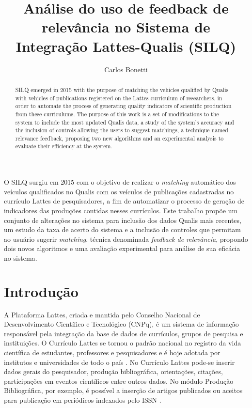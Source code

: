 \documentclass[12pt]{article}
\title{Análise do uso de feedback de relevância no Sistema de Integração Lattes-Qualis (SILQ)}
\author{Carlos Bonetti\inst{1}
}
\begin{document}
\maketitle

\begin{abstract}
   SILQ emerged in 2015 with the purpose of matching the vehicles qualified by Qualis with vehicles of publications registered on the Lattes curriculum of researchers, in order to automate the process of generating quality indicators of scientific production from these curriculums. The purpose of this work is a set of modifications to the system to include the most updated Qualis data, a study of the system's accuracy and the inclusion of controls allowing the users to suggest matchings, a technique named relevance feedback, proposing two new algorithms and an experimental analysis to evaluate their efficiency at the system.
\end{abstract}

\begin{resumo}
  O SILQ surgiu em 2015 com o objetivo de realizar o \textit{matching} automático dos veículos qualificados no Qualis com os veículos de publicações cadastradas no currículo Lattes de pesquisadores, a fim de automatizar o processo de geração de indicadores das produções contidas nesses currículos. Este trabalho propõe um conjunto de alterações no sistema para inclusão dos dados Qualis mais recentes, um estudo da taxa de acerto do sistema e a inclusão de controles que permitam ao usuário sugerir \textit{matching}, técnica denominada \textit{feedback de relevância}, propondo dois novos algoritmos e uma avaliação experimental para análise de sua eficácia no sistema.
\end{resumo}

\section{Introdução}

A Plataforma Lattes, criada e mantida pelo Conselho Nacional de Desenvolvimento Científico e Tecnológico (CNPq), é um sistema de informação responsável pela integração da base de dados de currículos, grupos de pesquisa e instituições. O Currículo Lattes se tornou o padrão nacional no registro da vida científica de estudantes, professores e pesquisadores e é hoje adotada por institutos e universidades de todo o país \cite{CNPQ-Sobre}. No Currículo Lattes pode-se inserir dados gerais do pesquisador, produção bibliográfica, orientações, citações, participações em eventos científicos entre outros dados. No módulo Produção Bibliográfica, por exemplo, é possível a inserção de artigos publicados ou aceitos para publicação em periódicos indexados pelo ISSN \cite{CNPQ-Ajuda}.
\end{document}
